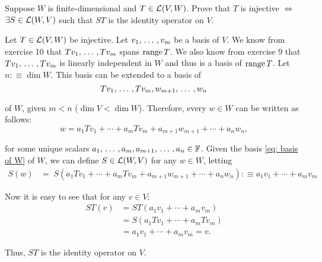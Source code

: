 \begin{xrcs}
  Suppose $W$ is finite-dimensional and $T\in \mathcal{L}(V,W)$. Prove that $T$ is injective $\iff$ $\exists S \in \mathcal{L}(W,V)$ such that $ST$ is the identity operator on $V$.

  \begin{prf}
    \Rightarrowdirection Let $T \in \mathcal{L} (V,W)$ be injective. Let $v_1, {\, \ldots \,\,}, v_m$ be a basis of $V$. We know from exercise 10 that $T v_1, {\, \ldots \,\,}, Tv_m$ spans $\operatorname{range} T$. We also know from exercise 9 that $T v_1, {\, \ldots \,\,}, Tv_m$ is linearly independent in $W$ and thus is a basis of $\operatorname{range} T$. Let $n :\equiv \dim W$. This basis can be extended to a basis of
    \begin{equation}
      \label{eq: basis of W}
      T v_1, {\, \ldots \,\,}, Tv_m, w_{m+1}, {\, \ldots \,\,}, w_n
    \end{equation}

    of $W$, given $m < n$ ($\dim V < \dim W$). Therefore, every $w \in W$ can be written as follows:
    \begin{equation}
      w = a_1 T v_1 + \cdots + a_m T v_m + a_{m+1} w_{m+1} + \cdots + a_{n} w_n,
    \end{equation}

    for some unique scalars $a_1, {\, \ldots \,\,}, a_m, a_{m+1}, {\, \ldots \,\,}, a_n \in \mathbb{F}$. Given the basis \eqref{eq: basis of W} of $W$, we can define $S \in \mathcal{L} (W,V)$ for any $w \in W$, letting
    \begin{equation}
      \begin{aligned}
        S(w) &= \;  S(a_1 T v_1 + \cdots + a_m T v_m + a_{m+1} w_{m+1} + \cdots + a_{n} w_n)
        :\equiv a_1 v_1 + \cdots + a_m v_m
      \end{aligned}
    \end{equation}

    Now it is easy to see that for any $v \in V$:
    \begin{equation}
      \begin{aligned}
        ST(v) &= ST(a_1 v_1 + \cdots + a_m v_m) \\
        &= S(a_1 T v_1 + \cdots + a_m T v_m) \\
        &= a_1 v_1 + \cdots + a_m v_m = v.
      \end{aligned}
    \end{equation}

    Thus, $ST$ is the identity operator on $V$.


\end{prf}
\end{xrcs}
